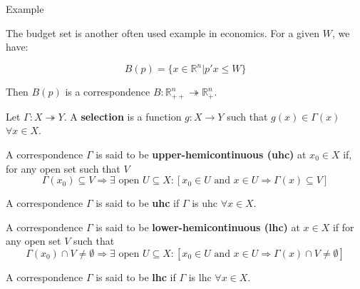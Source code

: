 \documentclass[aspectratio=169]{beamer}
\begin{document}
\begin{frame}{Example}

    The budget set is another often used example in economics. For a given $W$, we have:

    \[B(p) = \{x\in\mathds{R}^n | p'x\leq W\}\]

    Then $B(p)$ is a correspondence $B: \mathds{R}^n_{++}\twoheadrightarrow\mathds{R}^n_+$.
    
\end{frame}

\begin{frame}
    \begin{definition}
        Let $\Gamma:X\twoheadrightarrow Y$. A \textbf{selection} is a function $g:X\rightarrow Y$ such that $g(x)\in \Gamma(x)$ $\forall x\in X$.
    \end{definition}
\end{frame}

\begin{frame}
    \begin{definition}
        A correspondence $\Gamma$ is said to be \textbf{upper-hemicontinuous (uhc)} at $x_0\in X$ if, for any open set such that $V$ \[\Gamma(x_0)\subseteq V \Rightarrow \exists \text{ open } U\subseteq X:[x_0\in U \text{ and } x\in U\Rightarrow \Gamma(x)\subseteq V] \]
    \end{definition}

    \pause

    \begin{definition}
        A correspondence $\Gamma$ is said to be \textbf{uhc} if $\Gamma$ is uhc $\forall x\in X$.
    \end{definition}
\end{frame}

\begin{frame}
    \begin{definition}
        A correspondence $\Gamma$ is said to be \textbf{lower-hemicontinuous (lhc)} at $x\in X$ if for any open set $V$ such that
        \[\Gamma(x_0)\cap V \neq\emptyset\Rightarrow \exists \text{ open } U\subseteq X: [x_0\in U\text{ and }x\in U\Rightarrow \Gamma(x)\cap V\neq \emptyset]\]
        
    \end{definition}

    \begin{definition}
        A correspondence $\Gamma$ is said to be \textbf{lhc} if $\Gamma$ is lhc $\forall x\in X$.
    \end{definition}
\end{frame}
\end{document}
